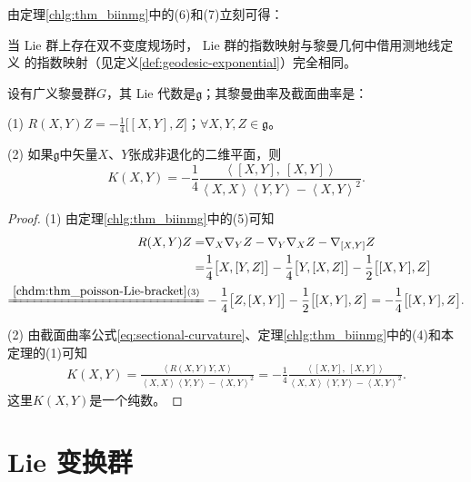 由定理\ref{chlg:thm_biinmg}中的(6)和(7)立刻可得：
\begin{corollary}\label{chlg:thm_expiso}
    当 Lie 群上存在双不变度规场时， Lie 群的指数映射与黎曼几何中借用测地线定义
    的指数映射（见定义\ref{def:geodesic-exponential}）完全相同。
\end{corollary}

\begin{theorem}
    设有广义黎曼群$G$，其 Lie 代数是$\mathfrak{g}$；其黎曼曲率及截面曲率是：

    (1) $R(X,Y)Z=-\frac{1}{4}\bigl[[X,Y],Z\bigr]$；$ \forall X,Y,Z\in \mathfrak{g}$。

    (2) 如果$\mathfrak{g}$中矢量$X$、$Y$张成非退化的二维平面，则
    \begin{equation}
        K(X,Y)=-\frac{1}{4} \frac{\left<[X,Y],\  [X,Y]\right>}
        {\left<X,X\right>\left<Y,Y\right>-\left<X,Y\right>^2} .
    \end{equation}
\end{theorem}
\begin{proof}
    (1) 由定理\ref{chlg:thm_biinmg}中的(5)可知
    \begin{align*}
        R(X,Y)Z =& \nabla_X \nabla_Y Z - \nabla_Y \nabla_X Z - \nabla_{[X,Y]} Z \\
        =&  \frac{1}{4} \bigl[X, [Y,Z]\bigr] - \frac{1}{4} \bigl[Y, [X,Z]\bigr]
        -\frac{1}{2} \bigl[[X,Y],Z\bigr] \\
        \xlongequal{\ref{chdm:thm_poisson-Lie-bracket}(3)}&
        -\frac{1}{4} \bigl[Z, [X,Y]\bigr] -\frac{1}{2} \bigl[[X,Y],Z\bigr]
        =  -\frac{1}{4} \bigl[[X,Y],Z\bigr] .
    \end{align*}

    (2) 由截面曲率公式\eqref{eq:sectional-curvature}、定理\ref{chlg:thm_biinmg}中的(4)和本定理的(1)可知
    \begin{align*}
        K(X,Y)
        = \frac{\left<R(X,Y)Y,X\right> } {\left<X,X\right>\left<Y,Y\right>-\left<X,Y\right>^2}
        = -\frac{1}{4} \frac{\left<[X,Y],\  [X,Y]\right>}
        {\left<X,X\right>\left<Y,Y\right>-\left<X,Y\right>^2} .
    \end{align*}
    这里$K (X, Y)$是一个纯数。
\end{proof}

\section{Lie 变换群}\label{chlg:sec_Lie-transformation-group}

